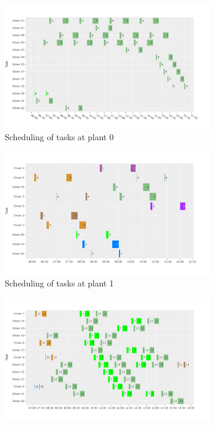 \begin{figure}[htb]
    \centering
    \begin{subfigure}{0.5\textwidth}
        \includegraphics[width=\linewidth]{depot_0.pdf}
        \vspace*{-2em}
        \caption{Scheduling of tasks at plant 0}
        \label{fig:plant0}
    \end{subfigure}%
    \hfill%
    \begin{subfigure}{0.5\textwidth}
        \includegraphics[width=\linewidth]{depot_1.pdf}
        \vspace*{-2em}
        \caption{Scheduling of tasks at plant  1}
        \label{fig:plant1}
    \end{subfigure}
    \vspace*{-1mm}
    \begin{subfigure}{\textwidth}
        \includegraphics[width=\linewidth]{depot_2.pdf}

\end{subfigure}
\end{figure}

